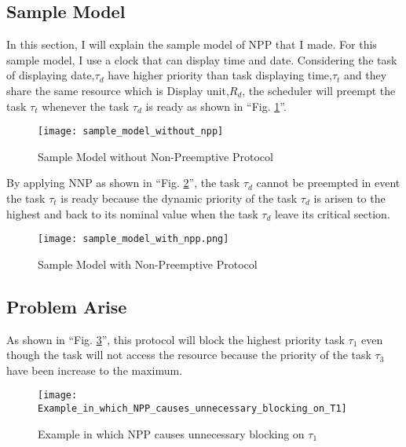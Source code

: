 \subsection{Sample Model}

In this section, I will explain the sample model of NPP that I made. For this sample model, I use a clock that can display time and date. Considering the task of displaying date,$\tau_{d}$ have higher priority than task displaying time,$\tau_{t}$ and they share the same resource which is Display unit,$R_{d}$, the scheduler will preempt the task $\tau_{t}$ whenever the task $\tau_{d}$ is ready as shown in ``Fig. \ref{fig:sample_model_without_npp}''.
\begin{figure}[ht]
    \centering
    \texttt{[image: sample\_model\_without\_npp]}
    \caption{Sample Model without Non-Preemptive Protocol} \cite{b6}
    \label{fig:sample_model_without_npp}
\end{figure}

By applying NNP as shown in ``Fig. \ref{fig:sample_model_with_npp}'', the task $\tau_{d}$ cannot be preempted in event the task $\tau_{t}$ is ready because the dynamic priority of the task $\tau_{d}$ is arisen to the highest and back to its nominal value when the task $\tau_{d}$ leave its critical section. 


\begin{figure}[ht]
    \centering
    \texttt{[image: sample\_model\_with\_npp.png]}
    \caption{Sample Model with Non-Preemptive Protocol }
    \label{fig:sample_model_with_npp}
\end{figure}


\subsection{Problem Arise}

As shown in ``Fig. \ref{fig:Example_in_which_NPP_causes_unnecessary_blocking_on_T1}'', this protocol will block the highest priority task $ \tau_{1} $ even though the task will not access the resource because the priority of the task $\tau_{3}$ have been increase to the maximum.

\begin{figure}[ht]
    \centering
    \texttt{[image: Example\_in\_which\_NPP\_causes\_unnecessary\_blocking\_on\_T1]}
    \caption{Example in which NPP causes unnecessary blocking on $ \tau_{1} $ \cite{b5}}
    \label{fig:Example_in_which_NPP_causes_unnecessary_blocking_on_T1}
\end{figure}

